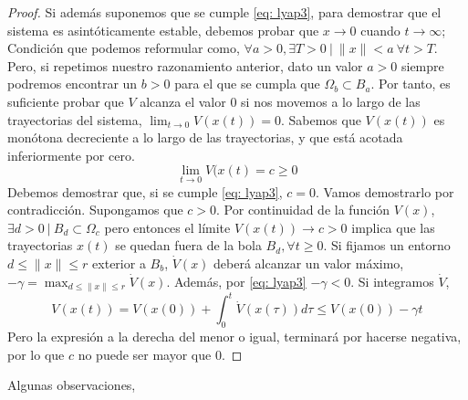 \begin{proof}
Si además suponemos que se cumple \ref{eq: lyap3}, para demostrar que el sistema es asintóticamente estable, debemos probar que $x \to 0$ cuando $t \to \infty$; Condición que podemos reformular como, $\forall a >0, \exists T>0\ | \ \|x\| < a \ \forall t>T$. Pero, si repetimos nuestro razonamiento anterior, dato un valor $a>0$ siempre podremos encontrar un $b>0$ para el que se cumpla que $ \Omega_b \subset B_a$. Por tanto, es suficiente probar que $V$ alcanza el valor $0$ si nos movemos a lo largo de las trayectorias del sistema, $\lim_{t \to 0}V(x(t))=0$. Sabemos que $V(x(t))$ es monótona decreciente a lo largo de las trayectorias, y que está acotada inferiormente por cero.
\begin{equation}
\lim_{t \to 0}V(x(t)=c \geq 0
\end{equation}
Debemos demostrar que,  si se cumple \ref{eq: lyap3}, $c=0$. Vamos  demostrarlo por contradicción. Supongamos que $c>0$. Por continuidad de la función $V(x)$, $\exists d>0\ | \ B_d \subset \Omega_c$ pero entonces el límite $V(x(t))\to c>0$ implica que las trayectorias $x(t)$ se quedan fuera de la bola $B_d, \forall t \geq 0$. Si fijamos  un entorno $d \leq \|x\| \leq r$ exterior a $B_b$, $\dot V(x)$ deberá alcanzar un valor máximo, $-\gamma =\max_{d \leq \| x \| \leq r} \dot{V}(x)$. Además, por \ref{eq: lyap3} $-\gamma < 0$. Si integramos $\dot V$,
\begin{equation*}
V(x(t)) = V(x(0)) + \int_0^t \dot V(x(\tau))d\tau \leq V(x(0)) -\gamma t
\end{equation*}
Pero la expresión a la derecha del menor o igual, terminará por hacerse negativa, por lo que $c$ no puede ser mayor que 0.
\end{proof}
Algunas observaciones,
